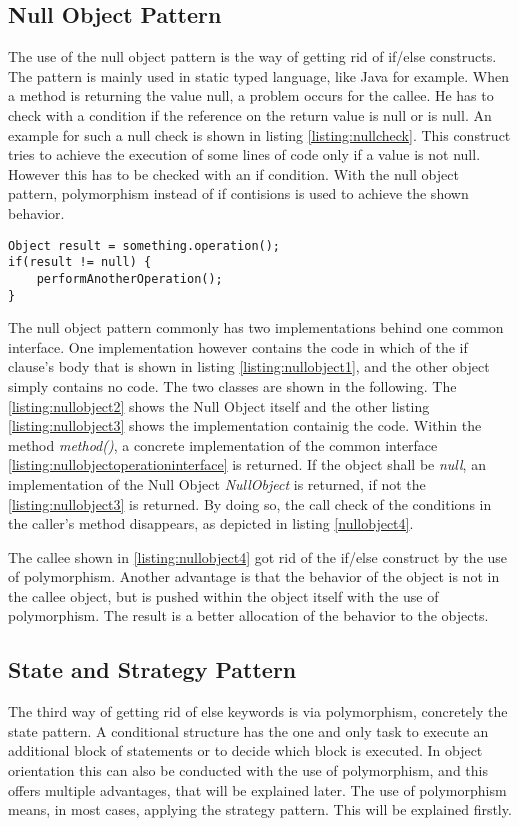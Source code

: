 \subsection*{Null Object Pattern}
The use of the null object pattern is the way of getting rid of if/else constructs. The pattern is mainly used in static typed language, like Java for example. When a method is returning the value null, a problem occurs for the callee. He has to check with a condition if the reference on the return value is null or is null. An example for such a null check is shown in listing \ref{listing:nullcheck}. This construct tries to achieve the execution of some lines of code only if a value is not null. However this has to be checked with an if condition. With the null object pattern, polymorphism instead of if contisions is used to achieve the shown behavior.
\\

\begin{lstlisting}
Object result = something.operation();
if(result != null) {
	performAnotherOperation();
}
\end{lstlisting}
\label{listing:nullcheck}

The null object pattern commonly has two implementations behind one common interface. One implementation however contains the code in which of the if clause's body that is shown in listing \ref{listing:nullobject1}, and the other object simply contains no code. The two classes are shown in the following. The \ref{listing:nullobject2} shows the Null Object itself and the other listing \ref{listing:nullobject3} shows the implementation containig the code. Within the method \textit{method()}, a concrete implementation of the common interface \ref{listing:nullobjectoperationinterface} is returned. If the object shall be \textit{null}, an implementation of the Null Object \textit{NullObject} is returned, if not the \ref{listing:nullobject3} is returned. By doing so, the call check of the conditions in the caller's method disappears, as depicted in listing \ref{nullobject4}.

The callee shown in \ref{listing:nullobject4} got rid of the if/else construct by the use of polymorphism. Another advantage is that the behavior of the object is not in the callee object, but is pushed within the object itself with the use of polymorphism. The result is a better allocation of the behavior to the objects.
\\

\subsection*{State and Strategy Pattern}
The third way of getting rid of else keywords is via polymorphism, concretely the state pattern. A conditional structure has the one and only task to execute an additional block of statements or to decide which block is executed. In object orientation this can also be conducted with the use of polymorphism, and this offers multiple advantages, that will be explained later. 
The use of polymorphism means, in most cases, applying the strategy pattern. This will be explained firstly. 
\\

